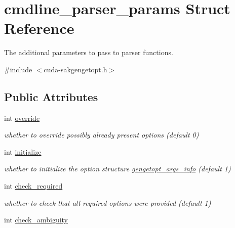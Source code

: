 \hypertarget{structcmdline__parser__params}{\section{cmdline\-\_\-parser\-\_\-params Struct Reference}
\label{structcmdline__parser__params}
}


The additional parameters to pass to parser functions.  




{\ttfamily \#include $<$cuda-\/sakgengetopt.\-h$>$}

\subsection*{Public Attributes}
\begin{DoxyCompactItemize}
\item 
\hypertarget{structcmdline__parser__params_ad3ff9d69146e69a47506782197b5675c}{int \hyperlink{structcmdline__parser__params_ad3ff9d69146e69a47506782197b5675c}{override}}\label{structcmdline__parser__params_ad3ff9d69146e69a47506782197b5675c}

\begin{DoxyCompactList}\small\item\em whether to override possibly already present options (default 0) \end{DoxyCompactList}\item 
\hypertarget{structcmdline__parser__params_a97ed8a6eabd39291ae7d73f273e12c11}{int \hyperlink{structcmdline__parser__params_a97ed8a6eabd39291ae7d73f273e12c11}{initialize}}\label{structcmdline__parser__params_a97ed8a6eabd39291ae7d73f273e12c11}

\begin{DoxyCompactList}\small\item\em whether to initialize the option structure \hyperlink{structgengetopt__args__info}{gengetopt\-\_\-args\-\_\-info} (default 1) \end{DoxyCompactList}\item 
\hypertarget{structcmdline__parser__params_a44ff439d7e9e36799e59173af74829c6}{int \hyperlink{structcmdline__parser__params_a44ff439d7e9e36799e59173af74829c6}{check\-\_\-required}}\label{structcmdline__parser__params_a44ff439d7e9e36799e59173af74829c6}

\begin{DoxyCompactList}\small\item\em whether to check that all required options were provided (default 1) \end{DoxyCompactList}\item 
\hypertarget{structcmdline__parser__params_a6e4442704fc40b0b655f7cc602f13ec4}{int \hyperlink{structcmdline__parser__params_a6e4442704fc40b0b655f7cc602f13ec4}{check\-\_\-ambiguity}}\label{structcmdline__parser__params_a6e4442704fc40b0b655f7cc602f13ec4}


\end{DoxyCompactItemize}
